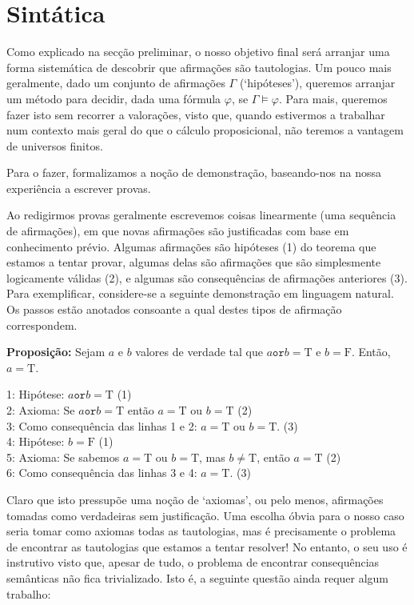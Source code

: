 \documentclass{report}
\theoremstyle{definition}
\theoremstyle{remark}
\newcommand{\lt}{\mathrm{T}}
\newcommand{\lf}{\mathrm{F}}
\newcommand{\por}{\mathbin{\texttt{or}}}
\begin{document}
	\section{Sintática}
	
	Como explicado na secção preliminar, o nosso objetivo final será arranjar uma forma sistemática de descobrir que afirmações são tautologias. Um pouco mais geralmente, dado um conjunto de afirmações $\Gamma$ (`hipóteses'), queremos arranjar um método para decidir, dada uma fórmula $\varphi$, se $\Gamma \vDash \varphi$. Para mais, queremos fazer isto sem recorrer a valorações, visto que, quando estivermos a trabalhar num contexto mais geral do que o cálculo proposicional, não teremos a vantagem de universos finitos.
	
	Para o fazer, formalizamos a noção de demonstração, baseando-nos na nossa experiência a escrever provas.
	
	Ao redigirmos provas geralmente escrevemos coisas linearmente (uma sequência de afirmações), em que novas afirmações são justificadas com base em conhecimento prévio. Algumas afirmações são hipóteses (1) do teorema que estamos a tentar provar, algumas delas são afirmações que são simplesmente logicamente válidas (2), e algumas são consequências de afirmações anteriores (3). Para exemplificar, considere-se a seguinte demonstração em linguagem natural. Os passos estão anotados consoante a qual destes tipos de afirmação correspondem.
	
	\medskip
	
	\textbf{Proposição:} Sejam $a$ e $b$ valores de verdade tal que $a \por b = \lt$ e $b = \lf$. Então, $a = \lt$.
	
	\begin{adjustwidth}{1cm}{}
	1: Hipótese: $a \por b = \lt$ (1)\\
	2: Axioma: Se $a \por b = \lt$ então $a = \lt$ ou $b = \lt$ (2)\\
	3: Como consequência das linhas 1 e 2: $a = \lt$ ou $b = \lt$. (3)\\
	4: Hipótese: $b = \lf$ (1)\\
	5: Axioma: Se sabemos $a = \lt$ ou $b = \lt$, mas $b \neq \lt$, então $a = \lt$ (2)\\
	6: Como consequência das linhas 3 e 4: $a = \lt$. (3)
	\end{adjustwidth}
	
	\medskip
	
	Claro que isto pressupõe uma noção de `axiomas', ou pelo menos, afirmações tomadas como verdadeiras sem justificação. Uma escolha óbvia para o nosso caso seria tomar como axiomas todas as tautologias, mas é precisamente o problema de encontrar as tautologias que estamos a tentar resolver! No entanto, o seu uso é instrutivo visto que, apesar de tudo, o problema de encontrar consequências semânticas não fica trivializado. Isto é, a seguinte questão ainda requer algum trabalho:
	
\end{document}
